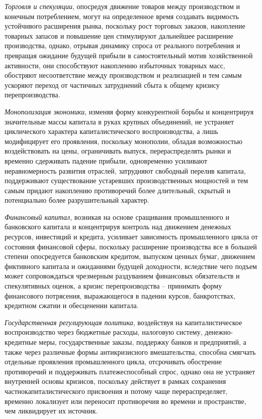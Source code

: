 \textit{Торговля и спекуляции}, опосредуя движение товаров между производством и конечным потреблением, могут на определенное время создавать видимость устойчивого расширения рынка, поскольку рост торговых заказов, накопление товарных запасов и повышение цен стимулируют дальнейшее расширение производства, однако, отрывая динамику спроса от реального потребления и превращая ожидание будущей прибыли в самостоятельный мотив хозяйственной активности, они способствуют накоплению избыточных товарных масс, обостряют несоответствие между производством и реализацией и тем самым ускоряют переход от частичных затруднений сбыта к общему кризису перепроизводства.

\textit{Монополизация экономики}, изменяя форму конкурентной борьбы и концентрируя значительные массы капитала в руках крупных объединений, не устраняет циклического характера капиталистического воспроизводства, а лишь модифицирует его проявления, поскольку монополии, обладая возможностью воздействовать на цены, ограничивать выпуск, перераспределять рынки и временно сдерживать падение прибыли, одновременно усиливают неравномерность развития отраслей, затрудняют свободный перелив капитала, поддерживают существование устаревших производственных мощностей и тем самым придают накоплению противоречий более длительный, скрытый и потенциально более разрушительный характер.

\textit{Финансовый капитал}, возникая на основе сращивания промышленного и банковского капитала и концентрируя контроль над движением денежных ресурсов, инвестиций и кредита, усиливает зависимость промышленного цикла от состояния финансовой сферы, поскольку расширение производства все в большей степени опосредуется банковским кредитом, выпуском ценных бумаг, движением фиктивного капитала и ожиданиями будущей доходности, вследствие чего подъем может сопровождаться чрезмерным раздуванием финансовых обязательств и спекулятивных оценок, а кризис перепроизводства – принимать форму финансового потрясения, выражающегося в падении курсов, банкротствах, кредитном сжатии и обесценении капитала.

\textit{Государственная регулирующая политика}, воздействуя на капиталистическое воспроизводство через бюджетные расходы, налоговую систему, денежно-кредитные меры, государственные заказы, поддержку банков и предприятий, а также через различные формы антикризисного вмешательства, способна смягчать отдельные проявления промышленного цикла, отсрочивать обострение противоречий и поддерживать платежеспособный спрос, однако она не устраняет внутренней основы кризисов, поскольку действует в рамках сохранения частнокапиталистического присвоения и потому чаще перераспределяет, временно локализует или переносит противоречия во времени и пространстве, чем ликвидирует их источник.


